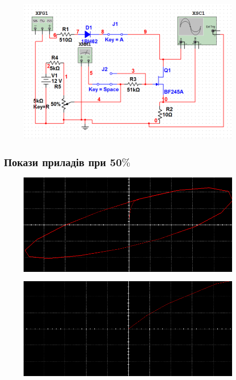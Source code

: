 \begin{figure}[ht]
\centering
\includegraphics[width=1\linewidth]{Pic/shema.png}
\end{figure}
\newpage

\subsection{Покази приладів при 50$\%$}

\begin{figure}[ht]
\centering
\includegraphics[width=1\linewidth]{Pic/51_1.png}
\end{figure}


\begin{figure}[ht]
\centering
\includegraphics[width=1\linewidth]{Pic/51_2.png}
\end{figure}
\newpage

